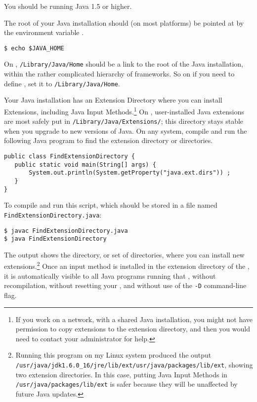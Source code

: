 \noindent
You should be running Java 1.5 or higher.

The root of your Java installation should (on most platforms) be pointed
at by the environment variable .  

\begin{Verbatim}
$ echo $JAVA_HOME
\end{Verbatim}

\noindent
On , \texttt{/Library/Java/Home} should be a link to the root
of the Java installation, within the rather complicated hierarchy of
 frameworks.  So on  if you need to define
, set it to \texttt{/Library/Java/Home}.

Your Java installation has an Extension Directory where you can install
Extensions, including Java Input Methods.\footnote{If you work on a
network, with a shared Java installation, you might not have permission
to copy extensions to the extension directory, and then you would need to
contact your administrator for help.}  On , user-installed
Java extensions are most safely put in
\texttt{/Library/Java/Extensions/}; this directory stays stable when you
upgrade to new versions of Java.  On any system, compile and run the
following Java program to find the extension directory or
directories.

\begin{Verbatim}
public class FindExtensionDirectory {
   public static void main(String[] args) {
       System.out.println(System.getProperty("java.ext.dirs")) ;
   }
}
\end{Verbatim}
 
\noindent
To compile and run this script, which should be stored in a file
named \texttt{FindExtensionDirectory.java}:

\begin{Verbatim}
$ javac FindExtensionDirectory.java
$ java FindExtensionDirectory
\end{Verbatim}

\noindent
The output shows the directory, or set of directories, where you can
install new extensions.\footnote{Running this program on my Linux system
produced the output 
\texttt{/usr/java/jdk1.6.0\_16/jre/lib/ext/usr/java/packages/lib/ext}, 
showing two extension directories.  In this
case, putting Java Input Methods in \texttt{/usr/java/packages/lib/ext}
is safer because they will be unaffected by future Java updates.} Once an
input method is installed in the extension directory of the ,
it is automatically visible to all Java programs running that ,
without recompilation, without resetting your , and
without use of the \verb!-D! command-line flag.  

